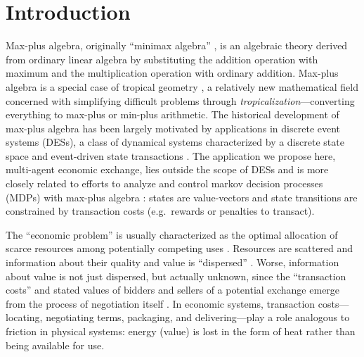 \documentclass[letterpaper, 10 pt, conference]{ieeeconf}
\begin{document}
\section{Introduction}
\label{sec:intro}
Max-plus algebra, originally ``minimax algebra'' \cite{cunninghamegreen1979}, is an algebraic theory derived from ordinary linear algebra by substituting the addition operation with maximum and the multiplication operation with ordinary addition. Max-plus algebra is a special case of tropical geometry \cite{maclagan2021}, a relatively new mathematical field concerned with simplifying difficult problems through \emph{tropicalization}---converting everything to max-plus or min-plus arithmetic. The historical development of max-plus algebra has been largely motivated by applications in discrete event systems (DESs), a class of dynamical systems characterized by a discrete state space and event-driven state transactions \cite{cassandras2008}.
The application we propose here, multi-agent economic exchange, lies outside the scope of DESs and is more closely related to efforts to analyze and control markov decision processes (MDPs) with max-plus algebra \cite{berthier2020,chandrashekar2014,goncalves2021,akian2008}: states are value-vectors and state transitions are constrained by transaction costs (e.g.~rewards or penalties to transact).

The “economic problem” is usually characterized as the optimal allocation of scarce resources among potentially competing uses \cite{robbins2007}. Resources are scattered and information about their quality and value is “dispersed” \cite{hayek1945}. Worse, information about value is not just dispersed, but actually unknown, since the “transaction costs” and stated values of bidders and sellers of a potential exchange emerge from the process of negotiation  itself \cite{coase1960}. In economic systems, transaction costs---locating, negotiating terms, packaging, and delivering---play a role analogous to friction in physical systems: energy (value) is lost in the form of heat rather than being available for use.
\end{document}
